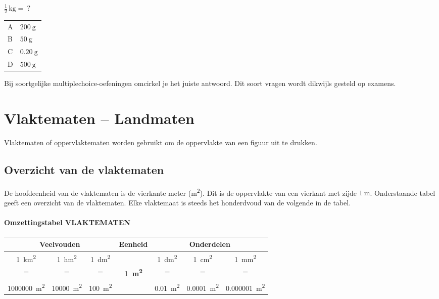 \documentclass[a4paper,12pt]{article}
\begin{document}
\(\tfrac{1}{2}\,\si{\kilo\gram}=\ ?\)\\
\begin{tabular}{@{}ll@{}}
  A & \(\SI{200}{\gram}\) \\
  B & \(\SI{50}{\gram}\) \\
  C & \(\SI{0.20}{\gram}\) \\
  D & \(\SI{500}{\gram}\) \\
\end{tabular}

\medskip
\noindent Bij soortgelijke multiplechoice-oefeningen omcirkel je het juiste antwoord. Dit soort vragen wordt dikwijls gesteld op examens.

\section{Vlaktematen -- Landmaten}
Vlaktematen of oppervlaktematen worden gebruikt om de oppervlakte van een figuur uit te drukken.

\subsection{Overzicht van de vlaktematen}
De hoofdeenheid van de vlaktematen is de vierkante meter (\si{\square\metre}). Dit is de oppervlakte van een vierkant met zijde \(\SI{1}{\metre}\). Onderstaande tabel geeft een overzicht van de vlaktematen. Elke vlaktemaat is steeds het honderdvoud van de volgende in de tabel.

\paragraph{Omzettingstabel VLAKTEMATEN}
\renewcommand{\arraystretch}{1.2}
\begin{center}
\setlength{\fboxsep}{4pt}\setlength{\fboxrule}{0.5pt}%
\begin{tabular}{*{7}{c}}
  \multicolumn{3}{c}{\textbf{Veelvouden}} & \textbf{Eenheid} & \multicolumn{3}{c}{\textbf{Onderdelen}}\\
  \midrule
\SI{1}{\square\kilo\metre} & \SI{1}{\square\hecto\metre} & \SI{1}{\square\deca\metre} &  & \SI{1}{\square\deci\metre} & \SI{1}{\square\centi\metre} & \SI{1}{\square\milli\metre}\\
= & = & = & \textbf{\SI{1}{\square\metre}} & = & = & =\\
\SI{1000000}{\square\metre} & \SI{10000}{\square\metre} & \SI{100}{\square\metre} & & \SI{0.01}{\square\metre} & \SI{0.0001}{\square\metre} & \SI{0.000001}{\square\metre}
\end{tabular}%
\end{center}
\end{document}
